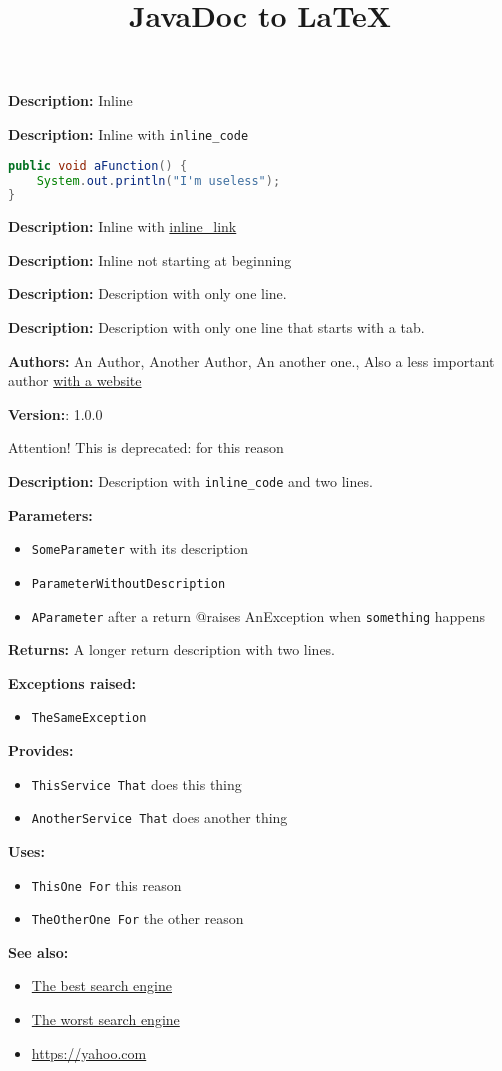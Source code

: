 \documentclass{article}
\title{JavaDoc to LaTeX}
\begin{document}
\textbf{Description:}
Inline

\textbf{Description:}
Inline with \texttt{inline_code }

\begin{lstlisting}[language=Java]
public void aFunction() {
	System.out.println("I'm useless");
}
\end{lstlisting}
\textbf{Description:}
Inline with \href{inline_link}{inline_link}

\textbf{Description:}
Inline not starting at beginning

\textbf{Description:}
 Description with only one line.

\textbf{Description:}
 Description with only one line that starts with a tab.

\textbf{Authors:} An Author,  Another Author,  An another one., Also a less important author \href{https://website.net}{with a website} 

\textbf{Version:}: 1.0.0 

Attention! This is deprecated: for this reason  

\textbf{Description:}
 Description with \texttt{inline_code} and two lines.  

\textbf{Parameters:}
\begin{itemize}
  \item\texttt{SomeParameter} with its description 
  \item\texttt{ParameterWithoutDescription}
  \item\texttt{AParameter} 		after a return @raises		AnException when \texttt{something} happens 
\end{itemize}

\textbf{Returns:}
A longer return description with two lines. 

\textbf{Exceptions raised:}
\begin{itemize}
  \item\texttt{TheSameException}  
\end{itemize}

\textbf{Provides:}
\begin{itemize}
  \item\texttt{ThisService		That} does this thing
  \item\texttt{AnotherService	That} does another thing
\end{itemize}

\textbf{Uses:}
\begin{itemize}
  \item\texttt{ThisOne			For} this reason
  \item\texttt{TheOtherOne		For} the other reason
\end{itemize}

\textbf{See also:}
\begin{itemize}
  \item\href{https://google.com}{The best search engine}
  \item\href{https://bing.com}{The worst search engine}
  \item\href{https://yahoo.com}{https://yahoo.com}
\end{itemize}
\end{document}
